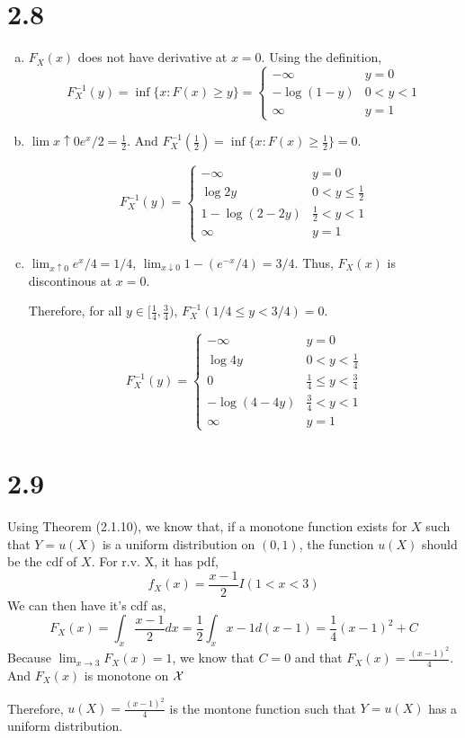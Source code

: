 \documentclass[letter]{article}
\newcommand{\cX}{\cal{X}}
\begin{document}
    \section*{2.8}
    \begin{enumerate}[(a)]
    \item $F_X(x)$ does not have derivative at $x=0$. Using the definition, 
    \[
    F^{-1}_X(y) = \inf\{x: F(x) \geq y\} = \begin{cases}
    -\infty & y=0\\
    -\log(1-y) & 0 < y < 1\\
    \infty & y = 1
    \end{cases}
    \]
    \item $\lim{x \uparrow 0} e^x/2 = \frac{1}{2}$.
    And $F^{-1}_X(\frac{1}{2}) = \inf\{x: F(x) \geq \frac{1}{2}\} = 0$.

    \[
    F^{-1}_X(y) = \begin{cases}
    -\infty & y = 0 \\
    \log 2y & 0 < y \leq \frac{1}{2} \\
    1-\log(2-2y) &  \frac{1}{2} < y < 1 \\
    \infty & y = 1
    \end{cases}
    \]

    \item $\lim_{x \uparrow 0} e^x/4 = 1/4$, 
    $\lim_{x \downarrow 0} 1-(e^{-x}/4) = 3/4$. Thus, $F_X(x)$ is discontinous
    at $x=0$.
    
    Therefore, for all $y \in [\frac{1}{4}, \frac{3}{4})$, 
    $F^{-1}_X(1/4 \leq y < 3/4) = 0$.

    \[
    F^{-1}_X(y) = \begin{cases}
    -\infty & y = 0 \\
    \log 4y & 0 < y < \frac{1}{4} \\
    0 & \frac{1}{4} \leq y < \frac{3}{4} \\
    -\log (4-4y) & \frac{3}{4} < y < 1 \\
    \infty & y = 1
    \end{cases}
    \]
    \end{enumerate}
    
    \section*{2.9}
    Using Theorem (2.1.10), we know that, if a monotone function exists for $X$
    such that $Y=u(X)$ is a uniform distribution on $(0,1)$, the function
    $u(X)$ should be the cdf of $X$.
    For r.v. X, it has pdf,
    \[
    f_X(x) = \frac{x-1}{2} I(1 < x < 3)
    \]
    We can then have it's cdf as,
    \[
    F_X(x) = \int_x \frac{x-1}{2} dx = \frac{1}{2} \int_x x-1 d(x-1) = \frac{1}{4}
    (x-1)^2 + C
    \]
    Because $\lim_{x \to 3} F_X(x) = 1$, we know that $C=0$ and 
    that $F_X(x) = \frac{(x-1)^2}{4}$. And $F_X(x)$ is monotone on $\cX$

    Therefore, $u(X) = \frac{(x-1)^2}{4}$ is the montone function such that
    $Y=u(X)$ has a uniform distribution.
\end{document}
